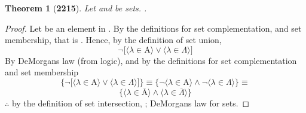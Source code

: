 \documentclass[preview]{standalone}
\newtheorem*{theorem*}{Theorem}
\begin{document}
\begin{theorem*}[\textbf{2215}] \color{black}
    Let  and \bm{$\Lambda$} be sets. 
    .
\end{theorem*}
\begin{proof} \color{black}
    Let \bm{$\lambda$} be an element in . 
    By the definitions for set complementation, and set membership, that is 
    . 
    Hence, by the definition of set union, 
    \begin{equation*}
        \lnot \bigg[
            \Big \langle \lambda \in \mathrm{A} \Big \rangle 
                \lor 
            \Big \langle \lambda \in \Lambda \Big \rangle
        \bigg]    
    \end{equation*}
    By DeMorgans law (from logic), 
    and by the definitions for set complementation
    and set membership
    \begin{equation*}
        \Bigg\{
            \lnot \bigg[
                \Big \langle \lambda \in \mathrm{A} \Big \rangle 
                    \lor 
                \Big \langle \lambda \in \Lambda \Big \rangle
            \bigg]
        \Bigg\}
        \equiv
        \Bigg\{
            \lnot \Big \langle \lambda \in \mathrm{A} \Big \rangle 
                \land 
            \lnot \Big \langle \lambda \in \Lambda \Big \rangle
        \Bigg\}
        \equiv
    \end{equation*}
    \begin{equation*}
        \Bigg\{
            \Big \langle \lambda \in \overline{\mathrm{A}} \Big \rangle 
                \land 
            \Big \langle \lambda \in \overline{\Lambda} \Big \rangle
        \Bigg\}
    \end{equation*}
    $\therefore$ by the definition of set intersection,
    ;
    DeMorgans law for sets.
\color{lightgray} \end{proof}
\end{document}

